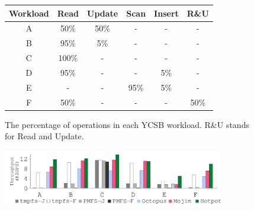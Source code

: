 {
\begin{figure}[th]\normalsize
\begin{minipage}{3.2in}
\begin{center}
\begin{tabular}{ c | c | c | c | c | c }\normalsize
\normalsize Workload & \normalsize Read & \normalsize Update & \normalsize Scan & \normalsize Insert & \normalsize R\&U \\
\hline
A & 50\% & 50\% & - & - & - \\
B & 95\% & 5\% & - & - & - \\
C & 100\% & - & - & - & - \\
D & 95\% & - & - & 5\% & - \\
E & - & - & 95\% & 5\% & - \\
F & 50\% & - & - & - & 50\% \\
\end{tabular}
\end{center}
\vspace{-0.2in}
{
The percentage of operations in each YCSB workload. 
R\&U stands for Read and Update.
}
\end{minipage}
\begin{minipage}{0.05in}
\hspace{0.05in}
\end{minipage}
\begin{minipage}{3.6in}
\begin{center}
\centerline{\includegraphics[width=3.8in]{Figures/g_plot_YCSB_run_throughput.pdf}}
{
}
\end{center}
\end{minipage}
\vspace{-0.2in}
\end{figure}
}
